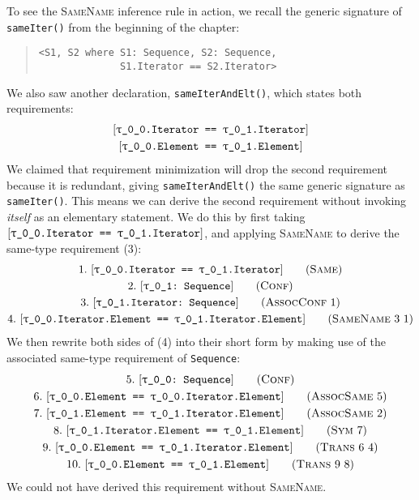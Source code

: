 \documentclass[../generics]{subfiles}
\begin{document}
\begin{example}\label{same name rule example}
To see the \textsc{SameName} inference rule in action, we recall the generic signature of \texttt{sameIter()} from the beginning of the chapter:
\begin{quote}
\begin{verbatim}
<S1, S2 where S1: Sequence, S2: Sequence,
              S1.Iterator == S2.Iterator>
\end{verbatim}
\end{quote}
We also saw another declaration, \texttt{sameIterAndElt()}, which states both requirements:
\begin{gather*}
\SameReq{\rT.Iterator}{\rU.Iterator}\\
\SameReq{\rT.Element}{\rU.Element}
\end{gather*}
We claimed that requirement minimization will drop the second requirement because it is redundant, giving \texttt{sameIterAndElt()} the same generic signature as \texttt{sameIter()}. This means we can derive the second requirement without invoking \emph{itself} as an elementary statement. We do this by first taking $\SameReq{\rT.Iterator}{\rU.Iterator}$, and applying \textsc{SameName} to derive the same-type requirement (3):
\begin{gather*}
\SameStep{\rT.Iterator}{\rU.Iterator}{1}\\
\ConfStep{\rU}{Sequence}{2}\\
\AssocConfStep{1}{\rU.Iterator}{Sequence}{3}\\
\SameNameStep{3}{1}{\rT.Iterator.Element}{\rU.Iterator.Element}{4}
\end{gather*}
We then rewrite both sides of (4) into their short form by making use of the associated same-type requirement of \texttt{Sequence}:
\begin{gather*}
\ConfStep{\rT}{Sequence}{5}\\
\AssocSameStep{5}{\rT.Element}{\rT.Iterator.Element}{6}\\
\AssocSameStep{2}{\rU.Element}{\rU.Iterator.Element}{7}\\
\SymStep{7}{\rU.Iterator.Element}{\rU.Element}{8}\\
\TransStep{6}{4}{\rT.Element}{\rU.Iterator.Element}{9}\\
\TransStep{9}{8}{\rT.Element}{\rU.Element}{10}
\end{gather*}
We could not have derived this requirement without \textsc{SameName}.
\end{example}
\end{document}
